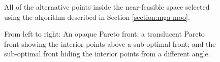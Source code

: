 \begin{figure}[h]
  \centering
  \resizebox{0.6\columnwidth}{!}{}
  \caption{All of the alternative points inside the near-feasible space selected
  using the algorithm described in Section \ref{section:mga-moo}.}
  \label{fig:nd-mga}
\end{figure}

\begin{figure}[H]
  \centering
  \resizebox{1\columnwidth}{!}{}
  \caption{From left to right: An opaque Pareto front; a translucent Pareto front showing the interior points above a sub-optimal front; and the sub-optimal front hiding the interior points from a different angle.}
  \label{fig:3d-mga}
\end{figure}